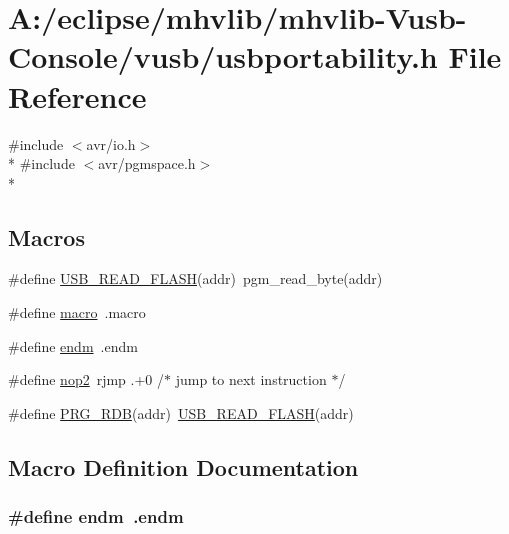 \hypertarget{mhvlib-_vusb-_console_2vusb_2usbportability_8h}{\section{A\-:/eclipse/mhvlib/mhvlib-\/\-Vusb-\/\-Console/vusb/usbportability.h File Reference}
\label{mhvlib-_vusb-_console_2vusb_2usbportability_8h}
}
{\ttfamily \#include $<$avr/io.\-h$>$}\\*
{\ttfamily \#include $<$avr/pgmspace.\-h$>$}\\*
\subsection*{Macros}
\begin{DoxyCompactItemize}
\item 
\#define \hyperlink{mhvlib-_vusb-_console_2vusb_2usbportability_8h_a078882d037ab92d73cc70b97738d552d}{U\-S\-B\-\_\-\-R\-E\-A\-D\-\_\-\-F\-L\-A\-S\-H}(addr)~pgm\-\_\-read\-\_\-byte(addr)
\item 
\#define \hyperlink{mhvlib-_vusb-_console_2vusb_2usbportability_8h_a27188a3f4bdad4750865cc4b0d001559}{macro}~.macro
\item 
\#define \hyperlink{mhvlib-_vusb-_console_2vusb_2usbportability_8h_a42431a55be9ecfc03292cc1601e5c4d9}{endm}~.endm
\item 
\#define \hyperlink{mhvlib-_vusb-_console_2vusb_2usbportability_8h_a62df5117c12fbb897e5d6956620d794b}{nop2}~rjmp    .+0 /$\ast$ jump to next instruction $\ast$/
\item 
\#define \hyperlink{mhvlib-_vusb-_console_2vusb_2usbportability_8h_af7c7b7892c3be6693e9107a0b4e1a75e}{P\-R\-G\-\_\-\-R\-D\-B}(addr)~\hyperlink{mhvlib-_vusb-_console_2vusb_2usbportability_8h_a078882d037ab92d73cc70b97738d552d}{U\-S\-B\-\_\-\-R\-E\-A\-D\-\_\-\-F\-L\-A\-S\-H}(addr)
\end{DoxyCompactItemize}


\subsection{Macro Definition Documentation}
\hypertarget{mhvlib-_vusb-_console_2vusb_2usbportability_8h_a42431a55be9ecfc03292cc1601e5c4d9}{
\subsubsection[{endm}]{\setlength{\rightskip}{0pt plus 5cm}\#define endm~.endm}}\label{mhvlib-_vusb-_console_2vusb_2usbportability_8h_a42431a55be9ecfc03292cc1601e5c4d9}



